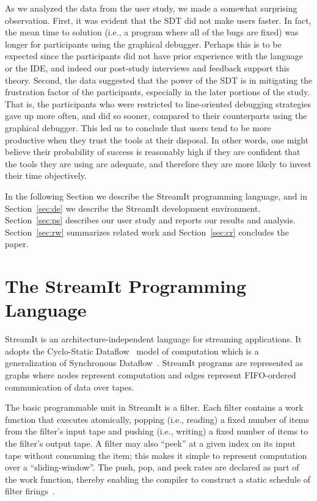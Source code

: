 \documentclass[times, 10pt,twocolumn]{article}
\begin{document}
As  we analyzed  the data  from  the user  study, we  made a  somewhat
surprising observation.   First, it was  evident that the SDT  did not
make users faster. In fact, the mean time to solution (i.e., a program
where all of the bugs are fixed) was longer for participants using the
graphical  debugger.   Perhaps  this  is  to  be  expected  since  the
participants did  not have prior  experience with the language  or the
IDE, and  indeed our post-study  interviews and feedback  support this
theory. Second,  the data suggested  that the power  of the SDT  is in
mitigating the  frustration factor of the  participants, especially in
the later portions  of the study.  That is,  the participants who were
restricted to  line-oriented debugging strategies gave  up more often,
and did so sooner, compared  to their counterparts using the graphical
debugger.   This  led  us to  conclude  that  users  tend to  be  more
productive  when they  trust the  tools  at their  disposal. In  other
words, one  might believe their  probability of success  is reasonably
high if they are confident that the tools they are using are adequate,
and therefore they are more likely to invest their time objectively.

In  the  following  Section   we  describe  the  StreamIt  programming
language,  and  in   Section~\ref{sec:de}  we  describe  the  StreamIt
development environment. Section~\ref{sec:ps} describes our user study
and reports our  results and analysis. Section~\ref{sec:rw} summarizes
related work and Section~\ref{sec:cr} concludes the paper.



\section{The StreamIt Programming Language}
\label{sec:pl}

StreamIt  is   an  architecture-independent  language   for  streaming
applications.  It adopts the Cyclo-Static Dataflow~\cite{BELP96} model
of   computation   which    is   a   generalization   of   Synchronous
Dataflow~\cite{LM87-i}.  StreamIt  programs are represented  as graphs
where  nodes represent  computation and  edges  represent FIFO-ordered
communication of data over tapes.

The  basic programmable  unit in  StreamIt is  a filter.   Each filter
contains  a work  function that executes atomically,  popping (i.e.,
reading)  a fixed number  of items  from the  filter's input  tape and
pushing (i.e., writing) a fixed number of items to the filter's output
tape.  A filter  may also ``peek'' at a given index  on its input tape
without  consuming  the  item;  this  makes  it  simple  to  represent
computation over a ``sliding-window''.   The push, pop, and peek rates
are  declared as  part  of  the work  function,  thereby enabling  the
compiler    to    construct    a    static    schedule    of    filter
firings~\cite{lee87static}.
\end{document}

